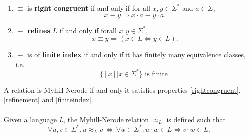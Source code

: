 \documentclass[11pt,a4paper,oneside]{book}
\begin{document}
            \begin{enumerate}[label=(\roman*)]

                \item\label{rightcongruent}
                    $\equiv$ is \textbf{right congruent} if and only if for all $x, y \in \Sigma^*$ and $a \in \Sigma$,
                    \[
                        x \equiv y \Rightarrow
                        x \cdot a \equiv y \cdot a.
                    \]

                
                \item\label{refinement}
                    $\equiv$ \textbf{refines} $L$ if and only if forall $x,y \in \Sigma^*$,
                    \[
                        x \equiv y \Rightarrow
                        (x \in L \Leftrightarrow y \in L).
                    \]

                \item\label{finiteindex}
                    $\equiv$ is of \textbf{finite index} if and only if it has finitely many equivalence classes, i.e.
                    \[
                        \{[x] | x \in \Sigma^*\} \mbox{ is finite }
                    \]

            \end{enumerate}

            \begin{definition}
                \label{MN_relation}
                A relation is Myhill-Nerode if and only it satisfies properties \ref{rightcongruent}, \ref{refinement} and \ref{finiteindex}.
            \end{definition}


            \paragraph{} Given a language $L$, the Myhill-Nerode relation $\approx_L$ is defined such that 
            \[
                \forall u, v \in \Sigma^*. \,
                u \approx_L v \, \Longleftrightarrow \, 
                \forall w \in \Sigma^*.\, u \cdot w \in L \Leftrightarrow v \cdot w \in L.
            \]
\end{document}
